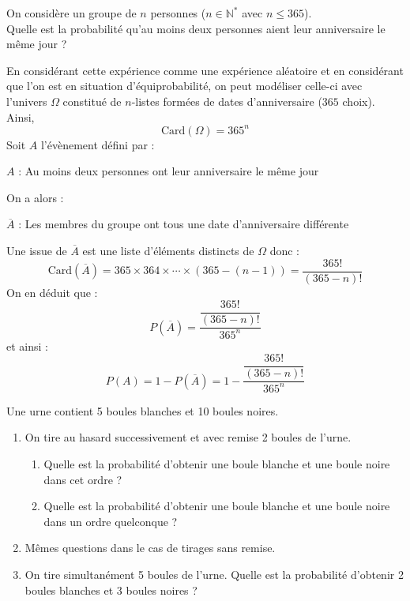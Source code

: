 \documentclass[a4paper,10pt]{report}
\begin{document}
\begin{Exa}
On considère un groupe de $n$ personnes ($n \in \mathbb{N}^*$ avec $n \leq 365$).\\
Quelle est la probabilité qu'au moins deux personnes aient leur anniversaire le même jour ?
\end{Exa}

\corr En considérant cette expérience comme une expérience aléatoire et en considérant que l'on est en situation d'équiprobabilité, on peut modéliser celle-ci avec l'univers $\Omega$ constitué de $n$-listes formées de dates d'anniversaire ($365$ choix). Ainsi,
$$ \textrm{Card}(\Omega) = 365^n$$
Soit $A$ l'évènement défini par :

\begin{center}
$A$ : \og Au moins deux personnes ont leur anniversaire le même jour \fg{} 
\end{center}
On a alors :
\begin{center}
$\overline{A}$ : \og Les membres du groupe ont tous une date d'anniversaire différente \fg{} 
\end{center}
Une issue de $\overline{A}$ est une liste d'éléments distincts de $\Omega$ donc :
$$ \textrm{Card}(\overline{A}) = 365 \times 364 \times \cdots \times (365-(n-1)) = \dfrac{365!}{(365-n)!}$$
On en déduit que :
$$ P(\overline{A}) = \dfrac{\dfrac{365!}{(365-n)!}}{365^n}$$
et ainsi :
$$ P(A) = 1- P(\overline{A}) = 1 - \dfrac{\dfrac{365!}{(365-n)!}}{365^n}$$


\begin{Exa} Une urne contient 5 boules blanches et 10 boules noires.

\begin{enumerate}
\item On tire au hasard successivement et avec remise 2 boules de l'urne.
\begin{enumerate}
\item Quelle est la probabilité d'obtenir une boule blanche et une boule noire dans cet ordre ?
\item Quelle est la probabilité d'obtenir une boule blanche et une boule noire dans un ordre quelconque ?
\end{enumerate}
\item Mêmes questions dans le cas de tirages sans remise.
\item On tire simultanément 5 boules de l'urne. Quelle est la probabilité d'obtenir 2 boules blanches et 3 boules noires ?
\end{enumerate}
\end{Exa}
\end{document}
